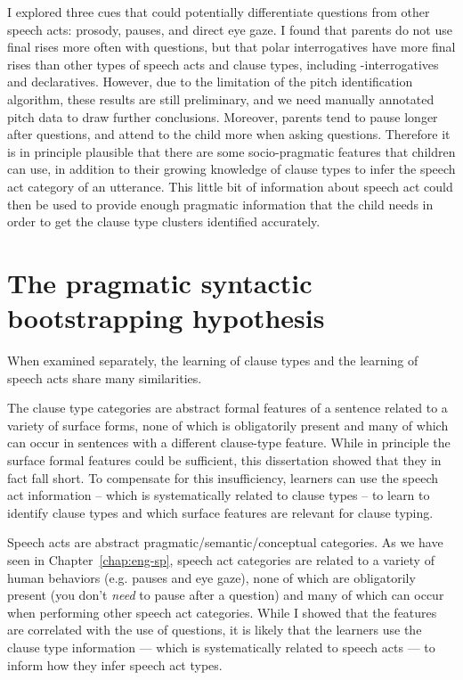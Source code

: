 I explored three cues that could potentially differentiate questions from other speech acts: prosody, pauses, and direct eye gaze. I found that parents do not use final rises more often with questions, but that polar interrogatives have more final rises than other types of speech acts and clause types, including \twh-interrogatives and declaratives. However, due to the limitation of the pitch identification algorithm, these results are still preliminary, and we need manually annotated pitch data to draw further conclusions. Moreover, parents tend to pause longer after questions, and attend to the child more when asking questions. Therefore it is in principle plausible that there are some socio-pragmatic features that children can use, in addition to their growing knowledge of clause types to infer the speech act category of an utterance. This little bit of information about speech act could then be used to provide enough pragmatic information that the child needs in order to get the clause type clusters identified accurately.

\section{The pragmatic syntactic bootstrapping hypothesis}

When examined separately, the learning of clause types and the learning of speech acts share many similarities. 


The clause type categories are abstract formal features of a sentence related to a variety of surface forms, none of which is obligatorily present and many of which can occur in sentences with a different clause-type feature. While in principle the surface formal features could be sufficient, this dissertation showed that they in fact fall short. To compensate for this insufficiency, learners can use the speech act information -- which is systematically related to clause types -- to learn to identify clause types and which surface features are relevant for clause typing.

Speech acts are abstract pragmatic/semantic/conceptual categories. As we have seen in Chapter~\ref{chap:eng-sp}, speech act categories are related to a variety of human behaviors (e.g. pauses and eye gaze), none of which are obligatorily present (you don't \emph{need} to pause after a question) and many of which can occur when performing other speech act categories. While I showed that the features are correlated with the use of questions, it is likely that the learners use the clause type information --- which is systematically related to speech acts --- to inform how they infer speech act types.

